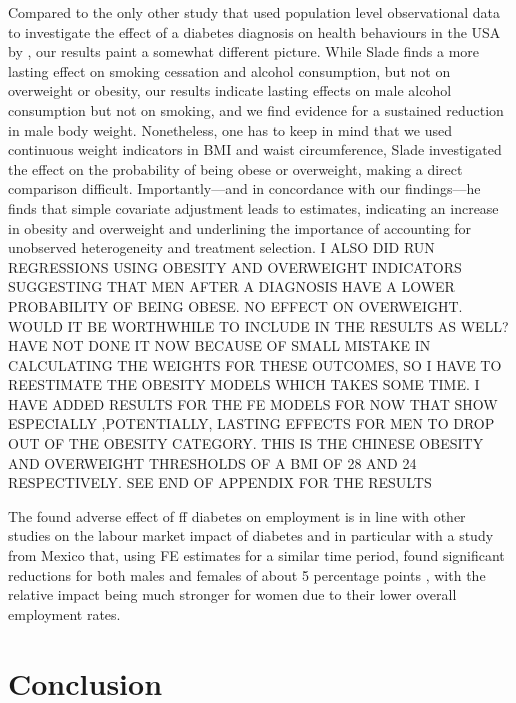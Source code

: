 Compared to the only other study that used population level observational data to investigate the effect of a diabetes diagnosis on health behaviours in the USA by \textcite{Slade2012}, our results paint a somewhat different picture. While Slade finds a more lasting effect on smoking cessation and alcohol consumption, but not on overweight or obesity, our results indicate lasting effects on male alcohol consumption but not on smoking, and we find evidence for a sustained reduction in male body weight. Nonetheless, one has to keep in mind that we used continuous weight indicators in \ac{BMI} and waist circumference, Slade investigated the effect on the probability of being obese or overweight, making a direct comparison difficult. Importantly---and in concordance with our findings---he finds that simple covariate adjustment leads to estimates, indicating an increase in obesity and overweight and underlining the importance of accounting for unobserved heterogeneity and treatment selection. I ALSO DID RUN REGRESSIONS USING OBESITY AND OVERWEIGHT INDICATORS SUGGESTING THAT MEN AFTER A DIAGNOSIS HAVE A LOWER PROBABILITY OF BEING OBESE. NO EFFECT ON OVERWEIGHT. WOULD IT BE WORTHWHILE TO INCLUDE IN THE RESULTS AS WELL? HAVE NOT DONE IT NOW BECAUSE OF SMALL MISTAKE IN CALCULATING THE WEIGHTS FOR THESE OUTCOMES, SO I HAVE TO REESTIMATE THE OBESITY MODELS WHICH TAKES SOME TIME. I HAVE ADDED RESULTS FOR THE FE MODELS FOR NOW THAT SHOW ESPECIALLY ,POTENTIALLY, LASTING EFFECTS FOR MEN TO DROP OUT OF THE OBESITY CATEGORY. THIS IS THE CHINESE OBESITY AND OVERWEIGHT THRESHOLDS OF A BMI OF 28 AND 24 RESPECTIVELY. SEE END OF APPENDIX FOR THE RESULTS

The found adverse effect of ff diabetes on employment is in line with other studies on the labour market impact of diabetes and in particular with a study from Mexico that, using \ac{FE} estimates for a similar time period, found significant reductions for both males and females of about 5 percentage points \parencite{Seuring2016}, with the relative impact being much stronger for women due to their lower overall employment rates.

\section{Conclusion}

